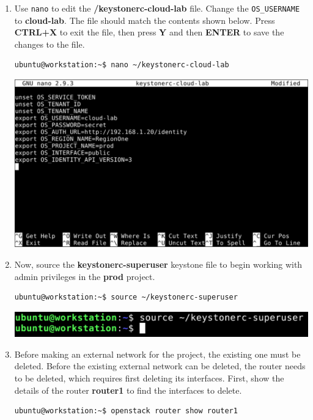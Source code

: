 \documentclass[letterpaper, 12pt]{article}
\begin{document}
\begin{enumerate}
    \item Use \texttt{nano} to edit the \textbf{\texttildemid/keystonerc-cloud-lab} file. Change the
    \texttt{OS\_USERNAME} to \textbf{cloud-lab}. The file should match the contents shown below. Press \textbf{CTRL+X}
    to exit the file, then press \textbf{Y} and then \textbf{ENTER} to save the changes to the file.
\begin{lstlisting}
ubuntu@workstation:~$ nano ~/keystonerc-cloud-lab
\end{lstlisting}

    \begin{center}
        \includegraphics[width=\linewidth]{images/part1/step11.png}
    \end{center}

    \item Now, source the \textbf{keystonerc-superuser} keystone file to begin working with admin privileges in the
    \textbf{prod} project.
\begin{lstlisting}
ubuntu@workstation:~$ source ~/keystonerc-superuser
\end{lstlisting}

    \begin{center}
        \includegraphics[width=\linewidth]{images/part1/step12.png}
    \end{center}

    \item Before making an external network for the project, the existing one must be deleted. Before the existing
    external network can be deleted, the router needs to be deleted, which requires first deleting its interfaces.
    First, show the details of the router \textbf{router1} to find the interfaces to delete.
\begin{lstlisting}
ubuntu@workstation:~$ openstack router show router1
\end{lstlisting}


\end{enumerate}
\end{document}
